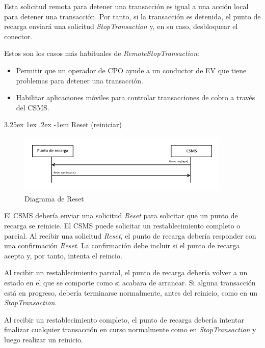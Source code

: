 \documentclass[12pt,a4paper,onecolumn,oneside]{report}
\makeatletter
\renewcommand\paragraph{\@startsection{paragraph}{5}{\z@}%
  {3.25ex \@plus1ex \@minus.2ex}%
  {-1em}%
  {\normalfont\normalsize\bfseries}}
\makeatother
\begin{document}
Esta solicitud remota para detener una transacción es igual a una acción local para detener una transacción. Por tanto, si la transacción es detenida, el punto de recarga enviará una solicitud \textit{StopTransaction} y, en su caso, desbloquear el conector.

Estos son los casos más habituales de \textit{RemoteStopTransaction}:
\begin{itemize}
\item Permitir que un operador de CPO ayude a un conductor de EV que tiene problemas para detener una transacción.
\item Habilitar aplicaciones móviles para controlar transacciones de cobro a través del CSMS.

\end{itemize}


\paragraph{Reset (reiniciar)}
\label{Reset (reiniciar)}


\begin{figure}[H] 
\centering
  \includegraphics[width=0.9\textwidth]{figuras/diagramareset.png}
  \caption[Diagrama de \textit{Reset}]{Diagrama de Reset\\
  }
  \label{fig:diagramareset}
\end{figure}


El CSMS debería enviar una solicitud \textit{Reset} para solicitar que un punto de recarga se reinicie. El CSMS puede solicitar un restablecimiento completo o parcial. Al recibir una solicitud \textit{Reset}, el punto de recarga debería responder con una confirmación \textit{Reset}. La confirmación debe incluir si el punto de recarga acepta y, por tanto, intenta el reincio.

Al recibir un restablecimiento parcial, el punto de recarga debería volver a un estado en el que se comporte como si acabara de arrancar. Si alguna transacción está en progreso, debería terminarse normalmente, antes del reinicio, como en un \textit{StopTransaction}.

Al recibir un restablecimiento completo, el punto de recarga debería intentar finalizar cualquier transacción en curso normalmente como en \textit{StopTransaction} y luego realizar un reinicio.
\end{document}
